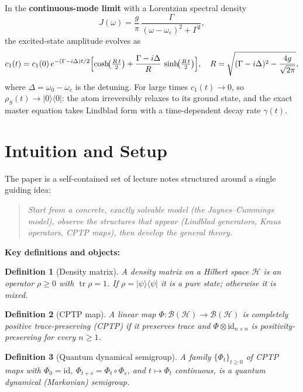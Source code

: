 \documentclass[11pt,a4paper]{article}
\newtheorem{definition}{Definition}
\begin{document}
In the \textbf{continuous-mode limit} with a Lorentzian spectral density
\[
  J(\omega) = \frac{g}{\pi}\,\frac{\Gamma}{(\omega - \omega_c)^2 + \Gamma^2},
\]
the excited-state amplitude evolves as
\[
  c_1(t) = c_1(0)\,e^{-(\Gamma - i\Delta)t/2}
    \Bigl[\cosh\!\bigl(\tfrac{R\,t}{2}\bigr)
      + \frac{\Gamma - i\Delta}{R}\,\sinh\!\bigl(\tfrac{R\,t}{2}\bigr)\Bigr],
  \quad R = \sqrt{(\Gamma - i\Delta)^2 - \frac{4g}{\sqrt{2\pi}}},
\]
where $\Delta = \omega_0 - \omega_c$ is the detuning.  For large times $c_1(t) \to 0$, so $\rho_S(t) \to |0\rangle\langle 0|$: the atom irreversibly relaxes to its ground state, and the exact master equation takes Lindblad form with a time-dependent decay rate $\gamma(t)$.

\section{Intuition and Setup}

The paper is a self-contained set of lecture notes structured around a single guiding idea:

\begin{quote}
\emph{Start from a concrete, exactly solvable model (the Jaynes--Cummings model), observe the structures that appear (Lindblad generators, Kraus operators, CPTP maps), then develop the general theory.}
\end{quote}

\textbf{Key definitions and objects:}

\begin{definition}[Density matrix]
A \emph{density matrix} on a Hilbert space $\mathcal{H}$ is an operator $\rho \ge 0$ with $\operatorname{tr}\rho = 1$.  If $\rho = |\psi\rangle\langle\psi|$ it is a \emph{pure state}; otherwise it is \emph{mixed}.
\end{definition}

\begin{definition}[CPTP map]
A linear map $\Phi: \mathcal{B}(\mathcal{H}) \to \mathcal{B}(\mathcal{H})$ is \emph{completely positive trace-preserving} (CPTP) if it preserves trace and $\Phi \otimes \mathrm{id}_{n\times n}$ is positivity-preserving for every $n \ge 1$.
\end{definition}

\begin{definition}[Quantum dynamical semigroup]
A family $\{\Phi_t\}_{t\ge 0}$ of CPTP maps with $\Phi_0 = \mathrm{id}$, $\Phi_{t+s} = \Phi_t \circ \Phi_s$, and $t \mapsto \Phi_t$ continuous, is a \emph{quantum dynamical (Markovian) semigroup}.
\end{definition}
\end{document}
